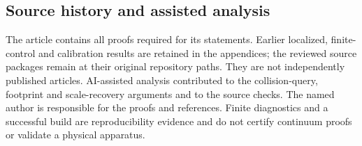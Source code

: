 \documentclass[11pt]{amsart}
\theoremstyle{definition}\newtheorem{definition}[theorem]{Definition}
\theoremstyle{remark}\newtheorem{remark}[theorem]{Remark}
\numberwithin{equation}{section}
\begin{document}
\subsection*{Source history and assisted analysis}
The article contains all proofs required for its statements. Earlier
localized, finite-control and calibration results are retained in the
appendices; the reviewed source packages remain at their original
repository paths. They are not independently published articles.
AI-assisted analysis contributed to the collision-query, footprint and
scale-recovery arguments and to the source checks. The named author is
responsible for the proofs and references. Finite diagnostics and a
successful build are reproducibility evidence and do not certify
continuum proofs or validate a physical apparatus.

\end{document}
